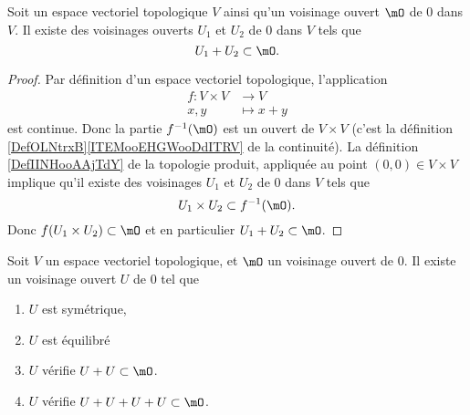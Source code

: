 \begin{lemma}     \label{LEMooQEFRooHAxOys}
    Soit un espace vectoriel topologique \( V\) ainsi qu'un voisinage ouvert \( \mO\) de \( 0\) dans \( V\). Il existe des voisinages ouverts \( U_1\) et \( U_2\) de \( 0\) dans \( V\) tels que
    \begin{equation}
        U_1+U_2\subset \mO.
    \end{equation}
\end{lemma}

\begin{proof}
    Par définition d'un espace vectoriel topologique, l'application
    \begin{equation}
        \begin{aligned}
            f\colon V\times V&\to V \\
            x,y&\mapsto x+y
        \end{aligned}
    \end{equation}
    est continue. Donc la partie \( f^{-1}(\mO)\) est un ouvert de \( V\times V\) (c'est la définition \ref{DefOLNtrxB}\ref{ITEMooEHGWooDdITRV} de la continuité). La définition \ref{DefIINHooAAjTdY} de la topologie produit, appliquée au point \( (0,0)\in V\times V\) implique qu'il existe des voisinages \( U_1\) et \( U_2\) de \( 0\) dans \( V\) tels que
    \begin{equation}
        U_1\times U_2\subset f^{-1}(\mO).
    \end{equation}
    Donc \( f(U_1\times U_2)\subset\mO\) et en particulier \( U_1+U_2\subset \mO\).
\end{proof}

\begin{proposition}\label{PROPSommeTopologique}
  Soit \( V \) un espace vectoriel topologique, et \( \mO \) un voisinage ouvert de \( 0 \). Il existe un voisinage ouvert \( U\) de \( 0 \) tel que
  \begin{enumerate}
      \item
        \( U\) est symétrique, 
    \item
        \( U\) est équilibré
    \item
        \( U\) vérifie \( U + U \subset \mO \).
    \item
        \( U\) vérifie \( U + U + U + U \subset \mO \).
  \end{enumerate}
\end{proposition}

